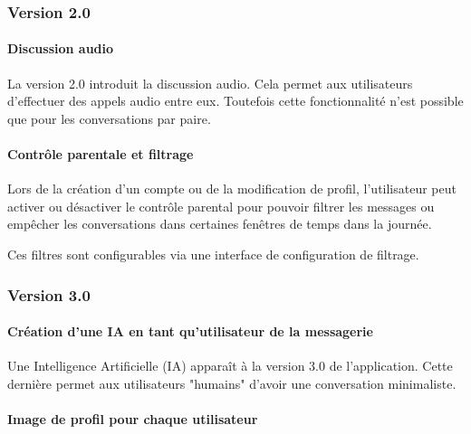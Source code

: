 \subsubsection{Version 2.0}

\paragraph{Discussion audio\newline}

\par La version 2.0 introduit la discussion audio. Cela permet aux utilisateurs d’effectuer des appels audio entre eux. Toutefois cette fonctionnalité n'est possible que pour les conversations par paire.

\paragraph{Contrôle parentale et filtrage\newline}

\par Lors de la création d’un compte ou de la modification de profil, l’utilisateur peut activer ou désactiver le contrôle parental pour pouvoir filtrer les messages ou empêcher les conversations dans certaines fenêtres de temps dans la journée.

\par Ces filtres sont configurables via une interface de configuration de filtrage.

\subsubsection{Version 3.0}

\paragraph{Création d’une IA en tant qu’utilisateur de la messagerie\newline}

\par Une Intelligence Artificielle (IA) apparaît à la version 3.0 de l’application. Cette dernière permet aux utilisateurs "humains" d’avoir une conversation minimaliste.

\paragraph{Image de profil pour chaque utilisateur\newline}

